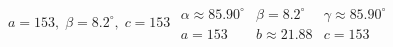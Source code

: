 { $a = 153, \; \beta = 8.2^{\circ}, \; c = 153$}
{ $\begin{array}{lll}\alpha \approx 85.90^{\circ} & \beta = 8.2^{\circ} & \gamma \approx 85.90^{\circ} \\a = 153 & b \approx 21.88 & c = 153 \end{array}$}
